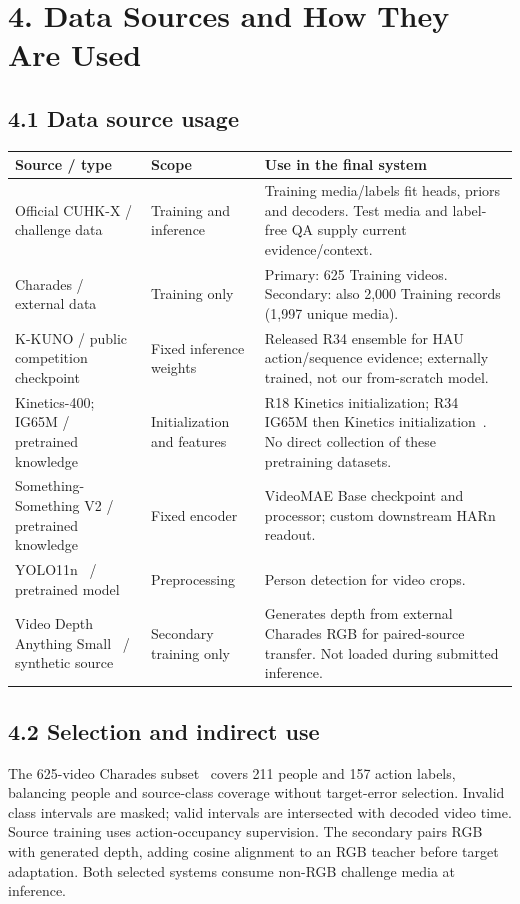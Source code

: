 \documentclass[12pt,a4paper]{article}
\newcommand{\pageheading}[1]{\vspace*{-5pt}\section*{#1}}
\begin{document}
\pageheading{4. Data Sources and How They Are Used}
\subsection*{4.1 Data source usage}
\begin{tabularx}{\linewidth}{@{}L{35mm}L{25mm}Y@{}}
\toprule
Source / type & Scope & Use in the final system\\
\midrule
Official CUHK-X / challenge data & Training and inference & Training media/labels fit heads, priors and decoders. Test media and label-free QA supply current evidence/context.\\
Charades / external data & Training only & Primary: 625 Training videos. Secondary: also 2,000 Training records (1,997 unique media).\\
K-KUNO / public competition checkpoint & Fixed inference weights & Released R34 ensemble for HAU action/sequence evidence; externally trained, not our from-scratch model.\\
Kinetics-400; IG65M / pretrained knowledge & Initialization and features & R18 Kinetics initialization; R34 IG65M then Kinetics initialization~\cite{ig65m}. No direct collection of these pretraining datasets.\\
Something-Something V2 / pretrained knowledge & Fixed encoder & VideoMAE Base checkpoint and processor; custom downstream HARn readout.\\
YOLO11n~\cite{yolo} / pretrained model & Preprocessing & Person detection for video crops.\\
Video Depth Anything Small~\cite{vda} / synthetic source & Secondary training only & Generates depth from external Charades RGB for paired-source transfer. Not loaded during submitted inference.\\
\bottomrule
\end{tabularx}

\subsection*{4.2 Selection and indirect use}
The 625-video Charades subset~\cite{charades} covers 211 people and 157 action labels, balancing people and source-class coverage without target-error selection. Invalid class intervals are masked; valid intervals are intersected with decoded video time. Source training uses action-occupancy supervision. The secondary pairs RGB with generated depth, adding cosine alignment to an RGB teacher before target adaptation. Both selected systems consume non-RGB challenge media at inference.
\end{document}
